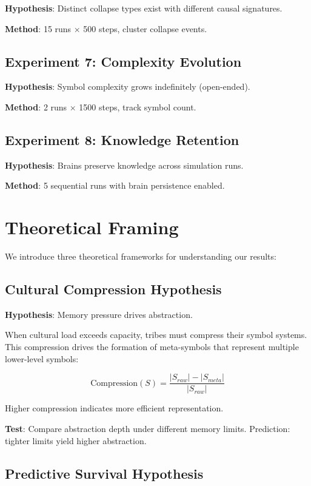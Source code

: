 \documentclass[11pt,a4paper]{article}
\begin{document}
\textbf{Hypothesis}: Distinct collapse types exist with different causal signatures.

\textbf{Method}: 15 runs $\times$ 500 steps, cluster collapse events.

\subsection{Experiment 7: Complexity Evolution}

\textbf{Hypothesis}: Symbol complexity grows indefinitely (open-ended).

\textbf{Method}: 2 runs $\times$ 1500 steps, track symbol count.

\subsection{Experiment 8: Knowledge Retention}

\textbf{Hypothesis}: Brains preserve knowledge across simulation runs.

\textbf{Method}: 5 sequential runs with brain persistence enabled.

\section{Theoretical Framing}

We introduce three theoretical frameworks for understanding our results:

\subsection{Cultural Compression Hypothesis}

\textbf{Hypothesis}: Memory pressure drives abstraction.

When cultural load exceeds capacity, tribes must compress their symbol systems. This compression drives the formation of meta-symbols that represent multiple lower-level symbols:

\begin{equation}
\text{Compression}(S) = \frac{|S_{raw}| - |S_{meta}|}{|S_{raw}|}
\end{equation}

Higher compression indicates more efficient representation.

\textbf{Test}: Compare abstraction depth under different memory limits. Prediction: tighter limits yield higher abstraction.

\subsection{Predictive Survival Hypothesis}
\end{document}

